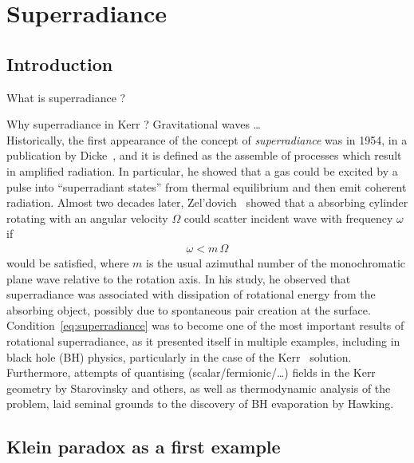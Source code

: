 
\chapter{Superradiance} %
\label{Chapter1}


\section{Introduction}

What is superradiance ? 

Why superradiance in Kerr ? Gravitational waves \ldots \\

Historically, the first appearance of the concept of \emph{superradiance} was in 1954, in a publication by Dicke~\cite{Dicke1954}, and it is defined as the assemble of processes which result in amplified radiation. In particular, he showed that a gas could be excited by a pulse into ``superradiant states'' from thermal equilibrium and then emit coherent radiation. Almost two decades later, Zel'dovich~\cite{Zeldovich1971,Zeldovich1972} showed that a absorbing cylinder rotating with an angular velocity $\Omega$ could scatter incident wave with frequency $\omega$ if
\begin{align}
    \omega < m\, \Omega
    \label{eq:superradiance}
\end{align}
would be satisfied, where $m$ is the usual azimuthal number of the monochromatic plane wave relative to the rotation axis.
In his study, he observed that superradiance was associated with dissipation of rotational energy from the absorbing object, possibly due to spontaneous pair creation at the surface. Condition~\eqref{eq:superradiance} was to become one of the most important results of rotational superradiance, as it presented itself in multiple examples, including in black hole (BH) physics, particularly in the case of the Kerr~\cite{Kerr19XX} solution. 
Furthermore, attempts of quantising (scalar/fermionic/\ldots) fields in the Kerr geometry by Starovinsky and others, as well as thermodynamic analysis of the problem, laid seminal grounds to the discovery of BH evaporation by Hawking. 


\section{Klein paradox as a first example}


